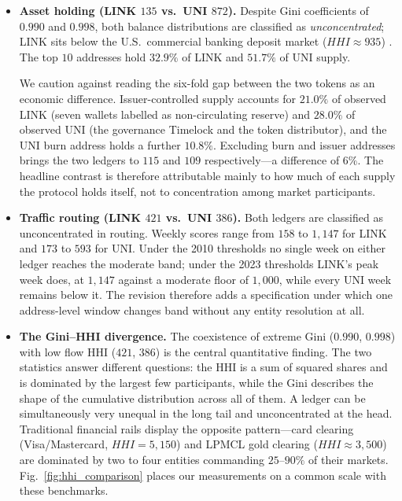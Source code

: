 \documentclass[final,5p,times]{elsarticle}
\begin{document}
\begin{itemize}
    \item \textbf{Asset holding (LINK $135$ vs.\ UNI $872$).} Despite Gini
    coefficients of $0.990$ and $0.998$, both balance distributions are
    classified as \textit{unconcentrated}; LINK sits below the U.S.\
    commercial banking deposit market ($HHI \approx 935$)
    \cite{ffiec2023bhc}. The top $10$ addresses hold $32.9\%$ of LINK and
    $51.7\%$ of UNI supply.

    We caution against reading the six-fold gap between the two tokens as an
    economic difference. Issuer-controlled supply accounts for $21.0\%$ of
    observed LINK (seven wallets labelled as non-circulating reserve) and
    $28.0\%$ of observed UNI (the governance Timelock and the token
    distributor), and the UNI burn address holds a further $10.8\%$.
    Excluding burn and issuer addresses brings the two ledgers to $115$ and
    $109$ respectively---a difference of $6\%$. The headline contrast is
    therefore attributable mainly to how much of each supply the protocol
    holds itself, not to concentration among market participants.

    \item \textbf{Traffic routing (LINK $421$ vs.\ UNI $386$).} Both ledgers
    are classified as unconcentrated in routing. Weekly scores range from $158$ to
    $1{,}147$ for LINK and $173$ to $593$ for UNI. Under the 2010 thresholds no
    single week on either ledger reaches the moderate band; under the 2023
    thresholds LINK's peak week does, at $1{,}147$ against a moderate floor of
    $1{,}000$, while every UNI week remains below it. The revision therefore
    adds a specification under which one address-level window changes band
    without any entity resolution at all.

    \item \textbf{The Gini--HHI divergence.} The coexistence of extreme Gini
    ($0.990$, $0.998$) with low flow HHI ($421$, $386$) is the central
    quantitative finding. The two statistics answer different questions: the
    HHI is a sum of squared shares and is dominated by the largest few
    participants, while the Gini describes the shape of the cumulative
    distribution across all of them. A ledger can be simultaneously very
    unequal in the long tail and unconcentrated at the head. Traditional
    financial rails display the opposite pattern---card clearing
    (Visa/Mastercard, $HHI = 5{,}150$) \cite{nilson2024cards} and LPMCL gold
    clearing ($HHI \approx 3{,}500$) \cite{lbma2023clearing} are dominated by
    two to four entities commanding $25$--$90\%$ of their markets.
    Fig.~\ref{fig:hhi_comparison} places our measurements on a common scale
    with these benchmarks.
\end{itemize}
\end{document}
